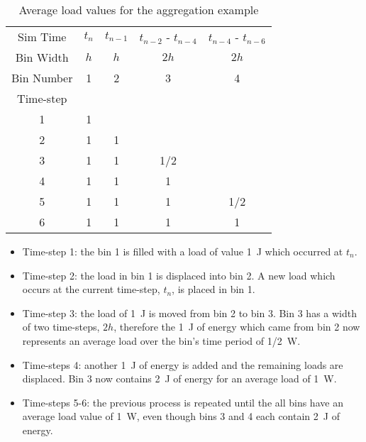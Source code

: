 \documentclass[review,12pt]{elsarticle}
\begin{document}
\begin{table}[htbp!]
\centering
\caption{Average load values for the aggregation example}
\label{tab:agg example}
\begin{tabular}{|c|c|c|c|c|}
\hline
Sim Time     & $t_n$    & $t_{n-1}$    & $t_{n-2}$ - $t_{n-4}$ & $t_{n-4}$ - $t_{n-6}$ \\
Bin Width    & $h$      & $h$          & $2h$                  & $2h$                  \\
Bin Number   & 1        & 2            & 3                     & 4                     \\
Time-step    &          &              &                       &                       \\ \hline
1            & 1        &              &                       &                       \\ \hline
2            & 1        & 1            &                       &                       \\ \hline
3            & 1        & 1            & 1/2                   &                       \\ \hline
4            & 1        & 1            & 1                     &                       \\ \hline
5            & 1        & 1            & 1                     & 1/2                   \\ \hline
6            & 1        & 1            & 1                     & 1                     \\ \hline
\end{tabular}
\end{table}

\begin{itemize}
    \item Time-step 1: the bin 1 is filled with a load of value \SI{1}{\joule} which occurred at $t_n$.
    \item Time-step 2: the load in bin 1 is displaced into bin 2. A new load which occurs at the current time-step, $t_n$, is placed in bin 1.
    \item Time-step 3: the load of \SI{1}{\joule} is moved from bin 2 to bin 3. Bin 3 has a width of two time-steps, $2h$, therefore the \SI{1}{\joule} of energy which came from bin 2 now represents an average load over the bin's time period of \SI{1/2}{\watt}.
    \item Time-steps 4: another \SI{1}{\joule} of energy is added and the remaining loads are displaced. Bin 3 now contains \SI{2}{\joule} of energy for an average load of \SI{1}{\watt}.
    \item Time-steps 5-6: the previous process is repeated until the all bins have an average load value of \SI{1}{\watt}, even though bins 3 and 4 each contain \SI{2}{\joule} of energy.
\end{itemize}
\end{document}
